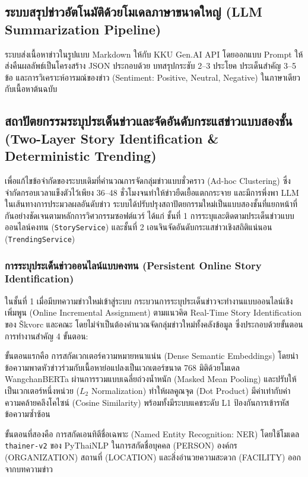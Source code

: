 \subsection{ระบบสรุปข่าวอัตโนมัติด้วยโมเดลภาษาขนาดใหญ่ (LLM Summarization Pipeline)}

ระบบส่งเนื้อหาข่าวในรูปแบบ Markdown ให้กับ KKU Gen.AI API โดยออกแบบ Prompt ให้ส่งคืนผลลัพธ์เป็นโครงสร้าง JSON ประกอบด้วย บทสรุปกระชับ 2--3 ประโยค ประเด็นสำคัญ 3--5 ข้อ และการวิเคราะห์อารมณ์ของข่าว (Sentiment: Positive, Neutral, Negative) ในภาษาเดียวกับเนื้อหาต้นฉบับ

\subsection{สถาปัตยกรรมระบุประเด็นข่าวและจัดอันดับกระแสข่าวแบบสองชั้น (Two-Layer Story Identification \& Deterministic Trending)}

เพื่อแก้ไขข้อจำกัดของระบบเดิมที่คำนวณการจัดกลุ่มข่าวแบบชั่วคราว (Ad-hoc Clustering) ซึ่งจำกัดกรอบเวลาแข็งตัวไว้เพียง 36--48 ชั่วโมงจนทำให้ข่าวยืดเยื้อแตกกระจาย และมีการพึ่งพา LLM ในเส้นทางการประมวลผลอันดับข่าว ระบบได้ปรับปรุงสถาปัตยกรรมใหม่เป็นแบบสองชั้นที่แยกหน้าที่กันอย่างชัดเจนตามหลักการวิศวกรรมซอฟต์แวร์ ได้แก่ ชั้นที่ 1 การระบุและติดตามประเด็นข่าวแบบออนไลน์คงทน (\texttt{StoryService}) และชั้นที่ 2 เอนจินจัดอันดับกระแสข่าวเชิงสถิติแน่นอน (\texttt{TrendingService})

\subsubsection{การระบุประเด็นข่าวออนไลน์แบบคงทน (Persistent Online Story Identification)}

ในชั้นที่ 1 เมื่อมีบทความข่าวใหม่เข้าสู่ระบบ กระบวนการระบุประเด็นข่าวจะทำงานแบบออนไลน์เชิงเพิ่มพูน (Online Incremental Assignment) ตามแนวคิด Real-Time Story Identification ของ Škvorc และคณะ \cite{skvorc2025realtime} โดยไม่จำเป็นต้องคำนวณจัดกลุ่มข่าวใหม่ทั้งคลังข้อมูล ซึ่งประกอบด้วยขั้นตอนการทำงานสำคัญ 4 ขั้นตอน:

ขั้นตอนแรกคือ การสกัดเวกเตอร์ความหมายหนาแน่น (Dense Semantic Embeddings) โดยนำข้อความพาดหัวข่าวร่วมกับเนื้อหาย่อแปลงเป็นเวกเตอร์ขนาด 768 มิติด้วยโมเดล WangchanBERTa ผ่านการรวมแบบเฉลี่ยถ่วงน้ำหนัก (Masked Mean Pooling) และปรับให้เป็นเวกเตอร์หนึ่งหน่วย ($L_2$ Normalization) ทำให้ผลคูณจุด (Dot Product) มีค่าเท่ากับค่าความคล้ายคลึงโคไซน์ (Cosine Similarity) พร้อมทั้งมีระบบแคชระดับ L1 ป้องกันการเข้ารหัสข้อความซ้ำซ้อน

ขั้นตอนที่สองคือ การสกัดเอนทิตีชื่อเฉพาะ (Named Entity Recognition: NER) โดยใช้โมเดล \texttt{thainer-v2} ของ PyThaiNLP ในการสกัดชื่อบุคคล (PERSON) องค์กร (ORGANIZATION) สถานที่ (LOCATION) และสิ่งอำนวยความสะดวก (FACILITY) ออกจากบทความข่าว

